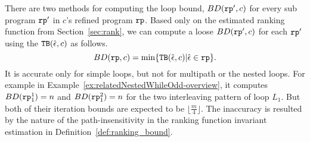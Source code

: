 
There are two methods for computing the loop bound, $BD(\mathtt{rp}', c)$ for every sub program $\mathtt{rp}'$ in $c$'s refined program $\mathtt{rp}$.
%
Based only on the estimated ranking function from Section~\ref{sec:rank}, we can compute a loose $BD(\mathtt{rp}', c)$ for each $\mathtt{rp}'$
using the ${\mathtt{TB}}(\hat{\mathtt{\epsilon}{}}, c)$ as follows.
\begin{equation}
  \label{eq:absBD}
  BD(\rprog, c) = \min\left\{ \absclr(\absevent, c) \middle\vert \absevent \in \rprog \right\}.
\end{equation}
It is accurate only for simple loops, but not for multipath or the nested loops.
For example in Example~\ref{ex:relatedNestedWhileOdd-overview},
it computes $BD(\mathtt{rp}_1^1) = n$ and $BD(\mathtt{rp}_1^2) = n $ for the two interleaving pattern of loop $L_1$.
But both of their iteration bounds are expected to be $\lfloor\frac{m}{4}\rfloor$.
The inaccuracy is resulted by the nature of the path-insensitivity in the ranking function invariant estimation in Definition~\ref{def:ranking_bound}. 

